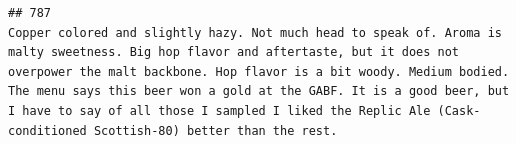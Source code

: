 \documentclass[
  a4paper,
]{article}
\begin{document}
\begin{verbatim}
## 787                                                                                                                                                                                                                                                                                                                                                                                                                                                                                                                                                                                                                                                                                                                                                                                                                                                                                                                                                                                                                                                                                                                                                                                                                                                                                                                                                                       Copper colored and slightly hazy. Not much head to speak of. Aroma is malty sweetness. Big hop flavor and aftertaste, but it does not overpower the malt backbone. Hop flavor is a bit woody. Medium bodied. The menu says this beer won a gold at the GABF. It is a good beer, but I have to say of all those I sampled I liked the Replic Ale (Cask-conditioned Scottish-80) better than the rest.

\end{verbatim}
\end{document}
